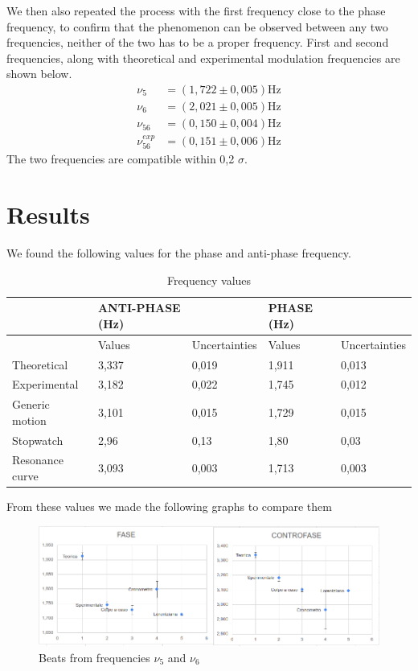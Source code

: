 \documentclass{article}
\begin{document}
We then also repeated the process with the first frequency close to the phase frequency, to confirm that the phenomenon can be observed between any two frequencies, neither of the two has to be a proper frequency. First and second frequencies, along with theoretical and experimental modulation frequencies are shown below.
\begin{align}
    \nu_{5} &= (1,722 \pm 0,005) \text{Hz} \\
    \nu_{6} &= (2,021 \pm 0,005) \text{Hz} \\
    \nu_{56} &= (0,150 \pm 0,004) \text{Hz} \\
    \nu_{56}^{exp} &= (0,151 \pm 0,006) \text{Hz} 
\end{align}
The two frequencies are compatible within 0,2 $\sigma$.

\pagebreak
\section{Results}
We found the following values for the phase and anti-phase frequency. 
\begin{table}[h]
    \centering
    \begin{tabular}{|l|l|l|l|l|}
    \hline
         & ANTI-PHASE (Hz) &  & PHASE (Hz) &  \\ \hline
         & Values & Uncertainties & Values & Uncertainties \\ \hline
        Theoretical & 3,337 & 0,019 & 1,911 & 0,013 \\ \hline
        Experimental & 3,182 & 0,022 & 1,745 & 0,012 \\ \hline
        Generic motion & 3,101 & 0,015 & 1,729 & 0,015 \\ \hline
        Stopwatch & 2,96 & 0,13 & 1,80 & 0,03 \\ \hline
        Resonance curve & 3,093 & 0,003 & 1,713 & 0,003 \\ \hline
    \end{tabular}
    \caption{Frequency values}
\end{table}

From these values we made the following graphs to compare them
\begin{figure}[h]
  \begin{center}
    \includegraphics[width=\textwidth]{phase-anti}
  \end{center}
  \label{img:freq_comp}
  \caption{Beats from frequencies  $\nu_5$ and $\nu_6$}
\end{figure}
\end{document}
